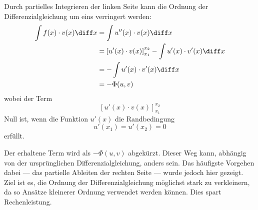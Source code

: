 Durch partielles Integrieren der linken Seite kann die Ordnung der Differenzialgleichung um eins verringert werden:
\begin{align}
    \int f(x) \cdot v(x) \diff x &= \int u''(x) \cdot v(x) \diff x \\
                                 &= \left[ u'(x) \cdot v(x) \right]_{x_1}^{x_2} - \int u'(x) \cdot v'(x) \diff x \\
                                 &= - \int u'(x) \cdot v'(x) \diff x \\
                                 &= - \Phi(u, v)
\end{align}
wobei der Term
\begin{equation}
    \left[ u'(x) \cdot v(x) \right]_{x_1}^{x_2}
\end{equation}
Null ist, wenn die Funktion $u'(x)$ die Randbedingung
\begin{equation}
    u'(x_1) = u'(x_2) = 0
\end{equation}
erfüllt. 

Der erhaltene Term wird als $-\Phi(u, v)$ abgekürzt.
Dieser Weg kann, abhängig von der ursprünglichen Differenzialgleichung, anders sein.
Das häufigste Vorgehen dabei --- das partielle Ableiten der rechten Seite --- wurde jedoch hier gezeigt.
Ziel ist es, die Ordnung der Differenzialgleichung möglichst stark zu verkleinern, da so Ansätze kleinerer Ordnung verwendet werden können.
Dies spart Rechenleistung.


